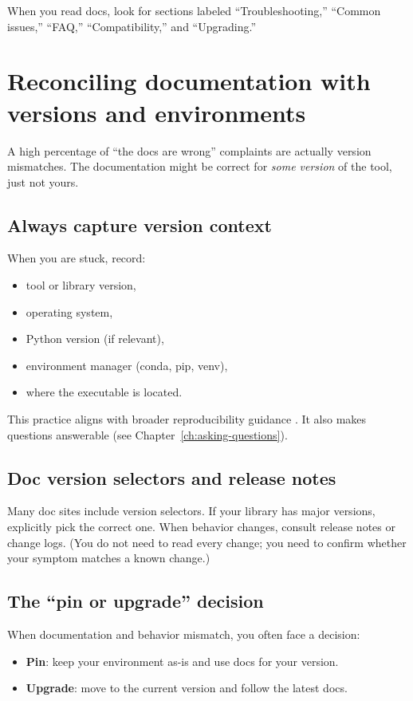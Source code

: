 When you read docs, look for sections labeled “Troubleshooting,” “Common issues,” “FAQ,” “Compatibility,” and “Upgrading.”

\section{Reconciling documentation with versions and environments}
A high percentage of “the docs are wrong” complaints are actually version mismatches. The documentation might be correct for \emph{some version} of the tool, just not yours.

\subsection{Always capture version context}
When you are stuck, record:
\begin{itemize}[noitemsep]
  \item tool or library version,
  \item operating system,
  \item Python version (if relevant),
  \item environment manager (conda, pip, venv),
  \item where the executable is located.
\end{itemize}

This practice aligns with broader reproducibility guidance \cite{wilson2017goodenough,turingway2025zenodo}. It also makes questions answerable (see Chapter~\ref{ch:asking-questions}).

\subsection{Doc version selectors and release notes}
Many doc sites include version selectors. If your library has major versions, explicitly pick the correct one. When behavior changes, consult release notes or change logs. (You do not need to read every change; you need to confirm whether your symptom matches a known change.)

\subsection{The “pin or upgrade” decision}
When documentation and behavior mismatch, you often face a decision:
\begin{itemize}[noitemsep]
  \item \textbf{Pin}: keep your environment as-is and use docs for your version.
  \item \textbf{Upgrade}: move to the current version and follow the latest docs.
\end{itemize}

